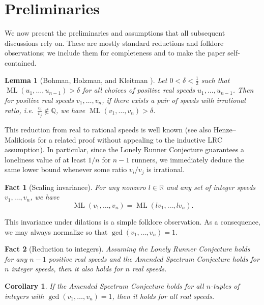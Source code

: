 \documentclass[11pt]{amsart}
\newtheorem{fact}{Fact}[section]
\newtheorem{lemma}{Lemma}[section]
\newtheorem{cor}{Corollary}[section]
\DeclareMathOperator{\ML}{ML}
\begin{document}
\section{Preliminaries}
\label{sec2}
\par We now present the preliminaries and assumptions that all subsequent discussions rely on. These are mostly standard reductions and folklore observations; we include them for completeness and to make the paper self-contained.

\begin{lemma}[Bohman, Holzman, and Kleitman \cite{bohman}]
\label{lem5}
    Let $0 < \delta < \tfrac{1}{2}$ such that $\ML(u_1,\ldots,u_{n - 1}) > \delta$ for all choices of positive real speeds $u_1,\ldots,u_{n - 1}$. Then for positive real speeds $v_1,\ldots,v_n$, if there exists a pair of speeds with irrational ratio, i.e.\ $\tfrac{v_i}{v_j} \notin \mathbb{Q}$, we have $\ML(v_1,\ldots,v_n) > \delta$.
\end{lemma}

\par This reduction from real to rational speeds is well known (see also Henze--Malikiosis \cite{henze2017} for a related proof without appealing to the inductive LRC assumption). In particular, since the Lonely Runner Conjecture guarantees a loneliness value of at least $1/n$ for $n-1$ runners, we immediately deduce the same lower bound whenever some ratio $v_i/v_j$ is irrational.

\begin{fact}[Scaling invariance]
    For any nonzero $l\in\mathbb{R}$ and any set of integer speeds $v_1,\ldots,v_n$, we have
    \[
       \ML(v_1,\ldots,v_n) = \ML(l v_1,\ldots,l v_n).
    \]
\end{fact}

\par This invariance under dilations is a simple folklore observation. As a consequence, we may always normalize so that $\gcd(v_1,\ldots,v_n)=1$.

\begin{fact}[Reduction to integers]
    Assuming the Lonely Runner Conjecture holds for any $n-1$ positive real speeds and the Amended Spectrum Conjecture holds for $n$ integer speeds, then it also holds for $n$ real speeds.
\end{fact}

\begin{cor}
    If the Amended Spectrum Conjecture holds for all $n$-tuples of integers with $\gcd(v_1,\ldots,v_n)=1$, then it holds for all real speeds.
\end{cor}
\end{document}
